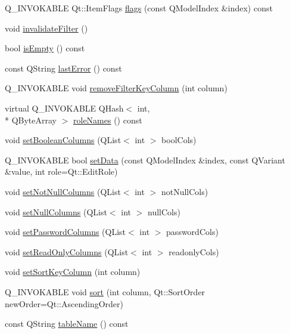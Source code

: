 \begin{DoxyCompactItemize}
\item 
Q\-\_\-\-I\-N\-V\-O\-K\-A\-B\-L\-E Qt\-::\-Item\-Flags \hyperlink{classSH__ExtendedProxyModel_aa12f3d989293da24fb47fd96a080cdc0}{flags} (const Q\-Model\-Index \&index) const 
\item 
void \hyperlink{classSH__ExtendedProxyModel_a7cfb1803f839023c7ba6fc67b900d76a}{invalidate\-Filter} ()
\item 
bool \hyperlink{classSH__ExtendedProxyModel_af8e37132288a46f527be0c67b652fdf5}{is\-Empty} () const 
\item 
const Q\-String \hyperlink{classSH__ExtendedProxyModel_afb11fa89e1181d88843ea0f7fb3fe654}{last\-Error} () const 
\item 
Q\-\_\-\-I\-N\-V\-O\-K\-A\-B\-L\-E void \hyperlink{classSH__ExtendedProxyModel_a631c2a56b4a301b9c8a855facec3ac1c}{remove\-Filter\-Key\-Column} (int column)
\item 
virtual Q\-\_\-\-I\-N\-V\-O\-K\-A\-B\-L\-E Q\-Hash$<$ int, \\*
Q\-Byte\-Array $>$ \hyperlink{classSH__ExtendedProxyModel_aead7c7969b112c3d0443051ae6a4757a}{role\-Names} () const 
\item 
void \hyperlink{classSH__ExtendedProxyModel_a2acefd1604abfef312fdaa65e57c2234}{set\-Boolean\-Columns} (Q\-List$<$ int $>$ bool\-Cols)
\item 
Q\-\_\-\-I\-N\-V\-O\-K\-A\-B\-L\-E bool \hyperlink{classSH__ExtendedProxyModel_aaaddcc27fdce4ef70f242460b8e053da}{set\-Data} (const Q\-Model\-Index \&index, const Q\-Variant \&value, int role=Qt\-::\-Edit\-Role)
\item 
void \hyperlink{classSH__ExtendedProxyModel_a9211b1bc09442298367565d7e0f62de4}{set\-Not\-Null\-Columns} (Q\-List$<$ int $>$ not\-Null\-Cols)
\item 
void \hyperlink{classSH__ExtendedProxyModel_a2a5734c26bb72fb11e50b9036914d987}{set\-Null\-Columns} (Q\-List$<$ int $>$ null\-Cols)
\item 
void \hyperlink{classSH__ExtendedProxyModel_a4bbea95e7483aeeef4709c12e5ef61c5}{set\-Password\-Columns} (Q\-List$<$ int $>$ password\-Cols)
\item 
void \hyperlink{classSH__ExtendedProxyModel_a985d27d4f35a303e0cd453a05910da1d}{set\-Read\-Only\-Columns} (Q\-List$<$ int $>$ readonly\-Cols)
\item 
void \hyperlink{classSH__ExtendedProxyModel_ab8123244a5060aa35f5bce651046b99d}{set\-Sort\-Key\-Column} (int column)
\item 
Q\-\_\-\-I\-N\-V\-O\-K\-A\-B\-L\-E void \hyperlink{classSH__ExtendedProxyModel_a2d5fdb58bf67879e3f3130619b93104a}{sort} (int column, Qt\-::\-Sort\-Order new\-Order=Qt\-::\-Ascending\-Order)
\item 
const Q\-String \hyperlink{classSH__ExtendedProxyModel_abb133e196ca7cf90b9c9b57263e898d6}{table\-Name} () const 
\end{DoxyCompactItemize}
